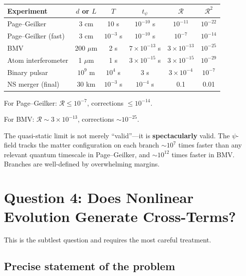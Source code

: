 \documentclass[12pt,a4paper]{article}
\begin{document}
\begin{center}
\renewcommand{\arraystretch}{1.3}
\begin{tabular}{lccccc}
\toprule
\textbf{Experiment} & $d$ or $L$ & $T$ & $t_\psi$ & $\mathcal{R}$ &
$\mathcal{R}^2$ \\
\midrule
Page--Geilker & 3 cm & 10 s & $10^{-10}$ s & $10^{-11}$ & $10^{-22}$ \\
Page--Geilker (fast) & 3 cm & $10^{-3}$ s & $10^{-10}$ s & $10^{-7}$
& $10^{-14}$ \\
BMV & 200 $\mu$m & 2 s & $7\times 10^{-13}$ s & $3\times 10^{-13}$
& $10^{-25}$ \\
Atom interferometer & 1 $\mu$m & 1 s & $3\times 10^{-15}$ s
& $3\times 10^{-15}$ & $10^{-29}$ \\
\midrule
Binary pulsar & $10^9$ m & $10^4$ s & 3 s & $3\times 10^{-4}$
& $10^{-7}$ \\
NS merger (final) & 30 km & $10^{-3}$ s & $10^{-4}$ s & 0.1 & 0.01 \\
\bottomrule
\end{tabular}
\end{center}

\begin{tcolorbox}[colback=green!5!white, colframe=dfdgreen,
title=Answer to Q3]
For Page--Geilker: $\mathcal{R} \leq 10^{-7}$, corrections $\leq 10^{-14}$.

For BMV: $\mathcal{R} \sim 3 \times 10^{-13}$, corrections $\sim 10^{-25}$.

The quasi-static limit is not merely ``valid''---it is
\textbf{spectacularly} valid. The $\psi$-field tracks the matter
configuration on each branch $\sim 10^7$ times faster than any relevant
quantum timescale in Page--Geilker, and $\sim 10^{12}$ times faster in BMV.
Branches are well-defined by overwhelming margins.
\end{tcolorbox}


\section{Question 4: Does Nonlinear Evolution Generate Cross-Terms?}
\label{sec:Q4}

This is the subtlest question and requires the most careful treatment.

\subsection{Precise statement of the problem}
\end{document}
